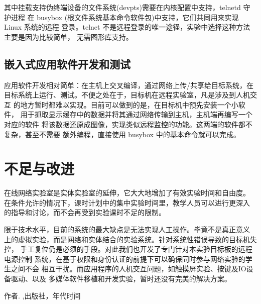 \documentclass[nofonts]{ctexart}
\begin{document}
其中挂载支持伪终端设备的文件系统(devpts)需要在内核配置中支持，telnetd 守护进程
在 busybox (根文件系统基本命令软件包)中支持，它们共同用来实现 Linux 系统的远程
登录。telnet 不是远程登录的唯一途径，实验中选择这种方法主要是因为比较简单，
无需图形库支持。

\subsection{嵌入式应用软件开发和测试}
	应用软件开发相对简单：在主机上交叉编译，通过网络上传/共享给目标系统，在
目标系统上运行、测试。不便之处在于，目标机在远程实验室，凡是涉及到人机交互
的地方暂时都难以实现。目前可以做到的是，在目标机中预先安装一个小软件，
用于抓取显示缓存中的数据并将其通过网络传输到主机，主机端再编写一个对应的软件
将该数据还原成图像，实现类似远程监控的功能。这两端的软件都不复杂，甚至不需要
额外编程，直接使用 busybox 中的基本命令就可以完成。

\section{不足与改进}
	在线网络实验室是实体实验室的延伸，它大大地增加了有效实验时间和自由度。
在条件允许的情况下，课时计划中的集中实验时间里，教学人员可以进行更深入
的指导和讨论，而不会再受到实验课时不足的限制。

	限于技术水平，目前的系统的最大缺点是无法实现人工操作。毕竟不是真正意义
上的虚拟实验，而是网络和实体结合的实验系统。针对系统性错误导致的目标机失控，
手工复位仍是必须的手段。对此我们也开发了专门针对本实验目标板的远程电源控制
系统，在基于权限和身份认证的前提下可以确保同时参与网络实验的学生之间不会
相互干扰。而应用程序的人机交互问题，如触摸屏实验、按键及IO设备驱动、以及
多媒体软件移植和开发实验，暂时还没有完美的解决方案。

\begin{thebibliography}{99}
作者. ,出版社，年代时间

\end{thebibliography}
\end{document}
